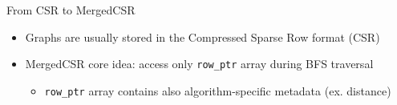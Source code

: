\begin{frame}{From CSR to MergedCSR}
\begin{itemize}
  \item<1-> Graphs are usually stored in the Compressed Sparse Row format (CSR)
  \item<2-> MergedCSR core idea: access only \texttt{row\_ptr} array during BFS traversal
  \begin{itemize}
    \item<2-> \texttt{row\_ptr} array contains also algorithm-specific metadata (ex. distance)
  \end{itemize}
\end{itemize}
\end{frame}

